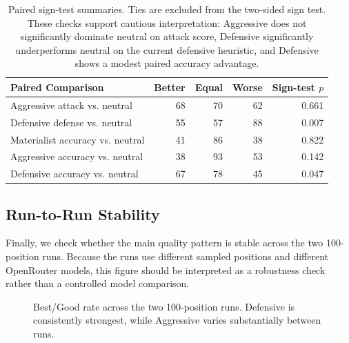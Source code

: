 \documentclass[10pt]{article}
\begin{document}
\begin{table}[!htbp]
\centering
\small
\begin{tabular}{lrrrr}
\toprule
Paired Comparison & Better & Equal & Worse & Sign-test $p$\\
\midrule
Aggressive attack vs. neutral & 68 & 70 & 62 & 0.661\\
Defensive defense vs. neutral & 55 & 57 & 88 & 0.007\\
Materialist accuracy vs. neutral & 41 & 86 & 38 & 0.822\\
Aggressive accuracy vs. neutral & 38 & 93 & 53 & 0.142\\
Defensive accuracy vs. neutral & 67 & 78 & 45 & 0.047\\
\bottomrule
\end{tabular}
\caption{Paired sign-test summaries. Ties are excluded from the two-sided sign test. These checks support cautious interpretation: Aggressive does not significantly dominate neutral on attack score, Defensive significantly underperforms neutral on the current defensive heuristic, and Defensive shows a modest paired accuracy advantage.}
\label{tab:sign-tests}
\end{table}

\FloatBarrier

\subsection{Run-to-Run Stability}

Finally, we check whether the main quality pattern is stable across the two 100-position runs. Because the runs use different sampled positions and different OpenRouter models, this figure should be interpreted as a robustness check rather than a controlled model comparison.

\begin{figure}[!htbp]
\centering
{}
\caption{Best/Good rate across the two 100-position runs. Defensive is consistently strongest, while Aggressive varies substantially between runs.}
\label{fig:run-stability}
\end{figure}
\end{document}
